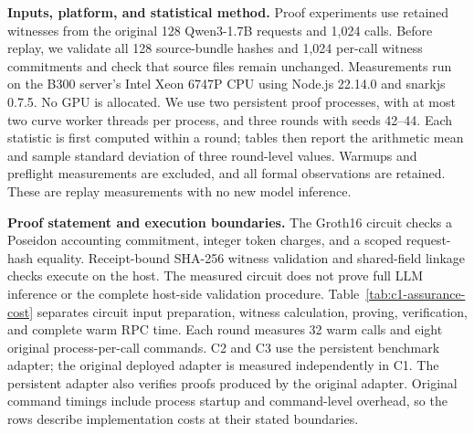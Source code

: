 \noindent\textbf{Inputs, platform, and statistical method.}
Proof experiments use retained witnesses from the original 128 Qwen3-1.7B
requests and 1,024 calls. Before replay, we validate all 128 source-bundle
hashes and 1,024 per-call witness commitments and check that source files
remain unchanged. Measurements run on the B300 server's Intel Xeon 6747P
CPU using Node.js 22.14.0 and snarkjs 0.7.5. No GPU is allocated.
We use two persistent proof processes, with at most two curve worker
threads per process, and three rounds with seeds 42--44.
Each statistic is first computed within a round; tables then report the
arithmetic mean and sample standard deviation of three round-level values.
Warmups and preflight measurements are excluded, and all formal observations
are retained. These are replay measurements with no new model inference.

\noindent\textbf{Proof statement and execution boundaries.}
The Groth16 circuit checks a Poseidon accounting commitment, integer token
charges, and a scoped request-hash equality. Receipt-bound SHA-256 witness
validation and shared-field linkage checks execute on the host.
The measured circuit does not prove full LLM inference or the complete
host-side validation procedure.
Table~\ref{tab:c1-assurance-cost} separates circuit input preparation,
witness calculation, proving, verification, and complete warm RPC time.
Each round measures 32 warm calls and eight original process-per-call
commands. C2 and C3 use the persistent benchmark adapter; the original
deployed adapter is measured independently in C1. The persistent adapter
also verifies proofs produced by the original adapter. Original command
timings include process startup and command-level overhead, so the rows
describe implementation costs at their stated boundaries.

